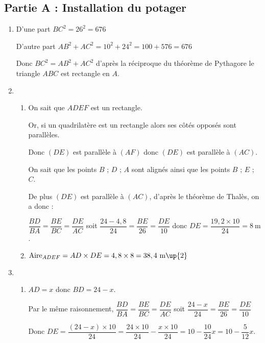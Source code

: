\subsection*{Partie A : Installation du potager}
\begin{enumerate}
    \item D'une part $BC^2 = 26^2 = 676$
    
    D'autre part $AB^2+AC^2 = 10^2+24^2 = 100+576 = 676$

    Donc $BC^2=AB^2+AC^2$ d'après la réciproque du théorème de Pythagore le triangle $ABC$ est rectangle en $A$.

    \item 
    \begin{enumerate}
        \item On sait que $ADEF$ est un rectangle.
        
        Or, si un quadrilatère est un rectangle alors ses côtés opposés sont parallèles.

        Donc $(DE)$ est parallèle à $(AF)$ donc $(DE)$ est parallèle à $(AC)$.

        On sait que les points $B$ ; $D$ ; $A$ sont alignés ainsi que les points $B$ ; $E$ ; $C$.
        
        De plus $(DE)$ est parallèle à $(AC)$, d’après le théorème de Thalès, on a donc :

        \medskip
        $\dfrac{BD}{BA}=\dfrac{BE}{BC}=\dfrac{DE}{AC}$ soit $\dfrac{24-4,8}{24}=\dfrac{BE}{26}=\dfrac{DE}{10}$ donc $DE = \dfrac{19,2\times 10}{24}=8~\text{m}$.

        \item $\text{Aire}_{ADEF} = AD\times DE = 4,8\times 8 = 38,4~\text{m\up{2}}$
        
    \end{enumerate}
    \item 
    \begin{enumerate}
        \item $AD=x$ donc $BD = 24-x$.
        
        Par le même raisonnement, $\dfrac{BD}{BA}=\dfrac{BE}{BC}=\dfrac{DE}{AC}$ soit $\dfrac{24-x}{24}=\dfrac{BE}{26}=\dfrac{DE}{10}$

        Donc $DE = \dfrac{(24-x)\times 10}{24} = \dfrac{24\times 10}{24}-\dfrac{x\times 10}{24} = 10 - \dfrac{10}{24}x = 10 -\dfrac{5}{12}x$.


\end{enumerate}
\end{enumerate}

